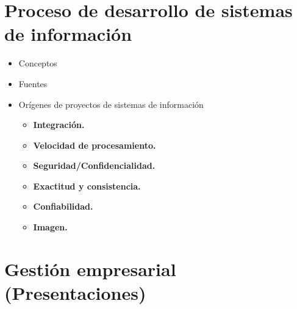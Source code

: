 \documentclass{templateNote}
\begin{document}
\section{Proceso de desarrollo de sistemas de información}
\begin{itemize}
    \item Conceptos
    \item Fuentes
    \item Orígenes de proyectos de sistemas de información 
    \begin{itemize}
        \item \textbf{Integración.}
        \item \textbf{Velocidad de procesamiento.}
        \item \textbf{Seguridad/Confidencialidad.}
        \item \textbf{Exactitud y consistencia.}
        \item \textbf{Confiabilidad.}
        \item \textbf{Imagen.}
    \end{itemize}
\end{itemize}
\newpage

\section{Gestión empresarial (Presentaciones)}
\end{document}
